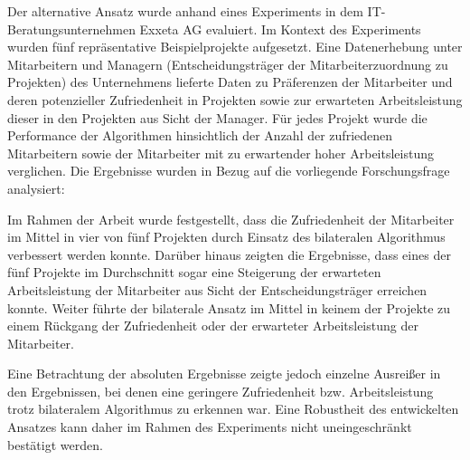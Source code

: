 Der alternative Ansatz wurde anhand eines Experiments in dem IT-Bera\-tungsunternehmen Exxeta AG evaluiert.
Im Kontext des Experiments wurden fünf repräsentative Beispielprojekte aufgesetzt.
Eine Datenerhebung unter Mitarbeitern und Managern (Entscheidungsträger der Mitarbeiterzuordnung zu Projekten) des Unternehmens lieferte Daten zu Präferenzen der Mitarbeiter und deren potenzieller Zufriedenheit in Projekten sowie zur erwarteten Arbeitsleistung dieser in den Projekten aus Sicht der Manager.
Für jedes Projekt wurde die Performance der Algorithmen hinsichtlich der Anzahl der zufriedenen Mitarbeitern sowie der Mitarbeiter mit zu erwartender hoher Arbeitsleistung verglichen.
Die Ergebnisse wurden in Bezug auf die vorliegende Forschungsfrage analysiert:
\forschungsfrage

Im Rahmen der Arbeit wurde festgestellt, dass die Zufriedenheit der Mitarbeiter im Mittel in vier von fünf Projekten durch Einsatz des bilateralen Algorithmus verbessert werden konnte.
Darüber hinaus zeigten die Ergebnisse, dass eines der fünf Projekte im Durchschnitt sogar eine Steigerung der erwarteten Arbeitsleistung der Mitarbeiter aus Sicht der Entscheidungsträger erreichen konnte.
Weiter führte der bilaterale Ansatz im Mittel in keinem der Projekte zu einem Rückgang der Zufriedenheit oder der erwarteter Arbeitsleistung der Mitarbeiter.

Eine Betrachtung der absoluten Ergebnisse zeigte jedoch einzelne Ausreißer in den Ergebnissen, bei denen eine geringere Zufriedenheit bzw. Arbeitsleistung trotz bilateralem Algorithmus zu erkennen war.
Eine Robustheit des entwickelten Ansatzes kann daher im Rahmen des Experiments nicht uneingeschränkt bestätigt werden.

